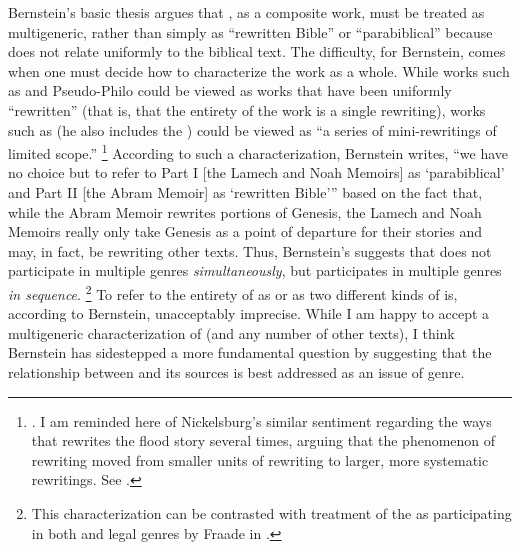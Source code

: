 Bernstein's basic thesis argues that \ga, as a composite work, must be treated as multigeneric, rather than simply as ``rewritten Bible'' or ``parabiblical'' because \ga does not relate uniformly to the biblical text. The difficulty, for Bernstein, comes when one must decide how to characterize the work as a whole. While works such as \jub and Pseudo-Philo could be viewed as works that have been uniformly ``rewritten'' (that is, that the entirety of the work is a single rewriting), works such as \ga (he also includes the \templescroll) could be viewed as ``a series of mini-rewritings of limited scope.''%
    \footnote{\Cite[336]{bernstein_berthelot-etal2010}. I am reminded here of Nickelsburg's similar sentiment regarding the ways that \firstenoch rewrites the flood story several times, arguing that the phenomenon of rewriting moved from smaller units of rewriting to larger, more systematic rewritings. See \cite[89--90]{nickelsburg_stone1984}.}
According to such a characterization, Bernstein writes, ``we have no choice but to refer to Part I [the Lamech and Noah Memoirs] as `parabiblical' and Part II [the Abram Memoir] as `rewritten Bible''' based on the fact that, while the Abram Memoir rewrites portions of Genesis, the Lamech and Noah Memoirs really only take Genesis as a point of departure for their stories and may, in fact, be rewriting other texts.%
    \autocite[337]{bernstein_berthelot-etal2010}
Thus, Bernstein's suggests that \ga does not participate in multiple genres \emph{simultaneously}, but participates in multiple genres \emph{in sequence}.%
    \footnote{This characterization can be contrasted with treatment of the \templescroll as participating in both \rwb and legal genres by Fraade in \cite*{fraade_goldstein-etal2017}.}
To refer to the entirety of \ga as \rwb or as two different kinds of \rwb is, according to Bernstein, unacceptably imprecise. While I am happy to accept a multigeneric characterization of \ga (and any number of other texts), I think Bernstein has sidestepped a more fundamental question by suggesting that the relationship between \ga and its sources is best addressed as an issue of genre. 

